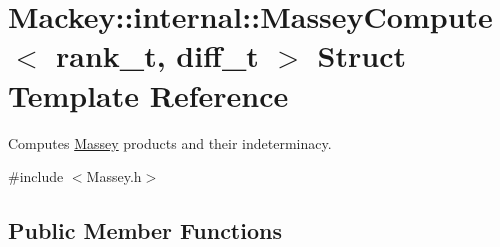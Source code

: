 \hypertarget{structMackey_1_1internal_1_1MasseyCompute}{}\section{Mackey\+:\+:internal\+:\+:Massey\+Compute$<$ rank\+\_\+t, diff\+\_\+t $>$ Struct Template Reference}
\label{structMackey_1_1internal_1_1MasseyCompute}


Computes \hyperlink{classMackey_1_1Massey}{Massey} products and their indeterminacy.  




{\ttfamily \#include $<$Massey.\+h$>$}

\subsection*{Public Member Functions}

